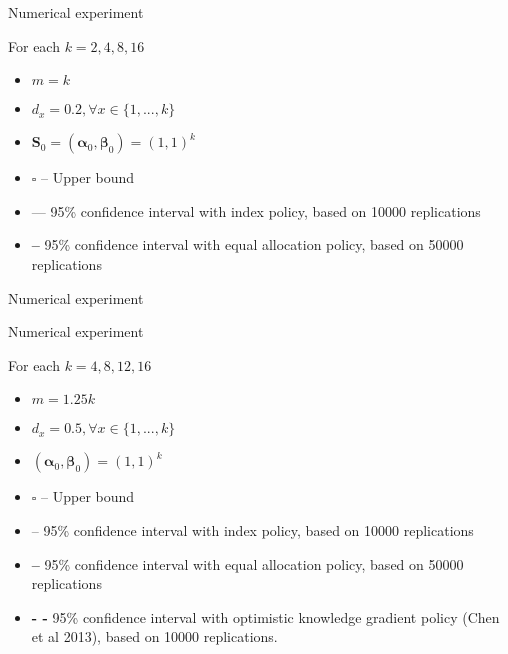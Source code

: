 \documentclass{beamer}
\newcommand{\Sv}{\mathbf{S}}
\newcommand{\betav}{\pmb{\beta}}
\newcommand{\alphav}{\pmb{\alpha}}
\begin{document}
\begin{frame}{Numerical experiment}

For each $k=2,4,8,16$
\begin{itemize}
\item $m = k$
\item $d_x = 0.2, \forall x \in \{1,...,k\}$
\item $\Sv_0=(\alphav_0,\betav_0)=(1,1)^k$
\item $\square$ -- Upper bound
\item --- 95\% confidence interval with index policy, based on 10000 replications
\item {\huge\textbf{--}}  95\% confidence interval with equal allocation policy, based on 50000 replications
\end{itemize}

\end{frame}


\begin{frame}{Numerical experiment}

\end{frame}

\begin{frame}{Numerical experiment}

For each $k=4,8,12, 16$
\begin{itemize}
\item $m = 1.25k$
\item $d_x = 0.5, \forall x \in \{1,...,k\}$
\item $(\alphav_0,\betav_0)=(1,1)^k$
\item $\square$ -- Upper bound
\item {\color{red}--} 95\% confidence interval with index policy, based on 10000 replications
\item {\huge\textbf{--}}  95\% confidence interval with equal allocation policy, based on 50000 replications
\item {\huge\textbf{- -}} 95\% confidence interval with optimistic knowledge gradient policy (Chen et al 2013), based on 10000 replications. 
\end{itemize}

\end{frame}
\end{document}
